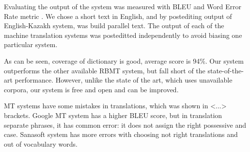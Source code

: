 \documentclass[11pt]{article}
\begin{document}
Evaluating the output of the system was measured with BLEU \citep{papineni02} and Word Error Rate 
metric \citep{levenshtein/1966}. We chose a short text in English, and by postediting output 
of English-Kazakh system, was build parallel text. The output of each of the machine
translation systems was posteditted independently to avoid biasing one particular system.

As can be seen,  coverage of dictionary is good, average score is 94\%. Our system outperforms the other 
available RBMT system, but fall short of the state-of-the-art performance. However, unlike the state of 
the art, which uses unavailable corpora, our system is free and open and can be improved.

MT systems have some mistakes in translations, which was shown in <...> brackets. Google MT system 
has a higher BLEU score, but in translation separate phrases, it has common error: it does not assign 
the right possessive and case. Sanasoft system has more errors with choosing not right translations 
and out of vocabulary words.
\end{document}
